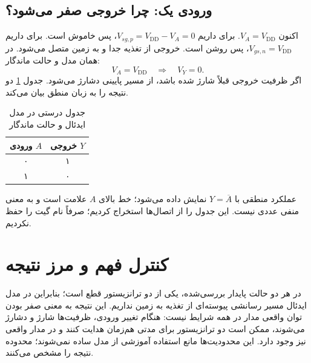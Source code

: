\subsection{ورودی یک: چرا خروجی صفر می‌شود؟}
اکنون \(V_A=V_{\mathrm{DD}}\). برای  داریم
\(V_{sg,p}=V_{\mathrm{DD}}-V_A=0\)، پس خاموش است.
برای  داریم \(V_{gs,n}=V_{\mathrm{DD}}\)، پس روشن است.
خروجی از تغذیه جدا و به زمین متصل می‌شود. در همان مدل و حالت ماندگار:
\begin{equation}\label{eq:inverter-high}
V_A=V_{\mathrm{DD}}\quad\Longrightarrow\quad V_Y=0.
\end{equation}
اگر ظرفیت خروجی قبلاً شارژ شده باشد، از مسیر پایینی دشارژ می‌شود.
جدول \ref{tab:inverter} دو نتیجه را به زبان منطق بیان می‌کند.

\begin{table}[ht]
\centering
\caption{جدول درستی  در مدل ایدئال و حالت ماندگار}
\label{tab:inverter}
\begin{tabular}{cc}
\toprule
ورودی \(A\) & خروجی \(Y\)\\
\midrule
۰ & ۱\\
۱ & ۰\\
\bottomrule
\end{tabular}
\end{table}

عملکرد منطقی با \(Y=\overline{A}\) نمایش داده می‌شود؛ خط بالای \(A\)
علامت  است و به معنی منفی عددی نیست. این جدول را از اتصال‌ها استخراج کردیم؛
صرفاً نام گیت را حفظ نکردیم.

\clearpage
\section{کنترل فهم و مرز نتیجه}
در هر دو حالت پایدار بررسی‌شده، یکی از دو ترانزیستور قطع است؛ بنابراین
در مدل ایدئال مسیر رسانشی پیوسته‌ای از تغذیه به زمین نداریم.
این نتیجه به معنی صفر بودن توان واقعی مدار در همه شرایط نیست:
هنگام تغییر ورودی، ظرفیت‌ها شارژ و دشارژ می‌شوند، ممکن است دو ترانزیستور
برای مدتی هم‌زمان هدایت کنند و در مدار واقعی  نیز وجود دارد.
این محدودیت‌ها مانع استفاده آموزشی از مدل ساده نمی‌شوند؛ محدوده نتیجه را مشخص می‌کنند.

